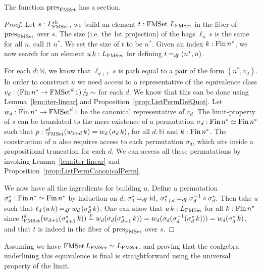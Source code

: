 \documentclass[a4paper,USenglish,cleveref]{lipics-v2021}
\begin{document}
\begin{theorem}\label{thm:PresSplitEpi}
 The function $\pres{\FMSet}$ has a section.
\end{theorem}
\begin{proof}
  Let $s : \LimSh{\FMSet}$, we build an element $t : \FMSet \,\Lim{\FMSet}$ in the fiber of $\pres{\FMSet}$ over $s$. The size (i.e. the 1st projection) of the bags $\ell_n\,s$ is the same for all $n$, call it $n^*$. We set the size of $t$ to be $n^*$. Given an index $k : \Fin n^*$, we now search for an element $u\,k : \Lim{\FMSet}$ for defining $t \DefEq (n^*,u)$.

  For each $d : ℕ$, we know that $\ell_{d + 1}\,s$ is path equal to a pair of the form $(n^*,v_d)$. In order to construct $u$ we need access to a representative of the equivalence class $v_d : \SetQuot[(\Fin n^* \to \FMSet^d 1)][\sim]$ for each $d$. We know that this can be done using Lemma~\ref{lem:iter-linear} and Proposition~\ref{prop:ListPermDefQuot}. Let $w_d : \Fin n^* \to \FMSet^d 1$ be the canonical representative of $v_d$.
  The limit-property of $s$ can be translated to the mere existence of a permutation $\sigma_d : \Fin n^* \simeq \Fin n^*$
  such that $p : \Bang_{\FMSet}^d(w_{1 + d}\, k) = w_d \,(\sigma_d\,k)$, for all $d: ℕ$ and $k : \Fin n^*$. The construction of $u$ also requires access to each permutation $\sigma_d$, which sits inside a propositional truncation for each $d$. We can access all these permutations by invoking Lemma~\ref{lem:iter-linear} and Proposition~\ref{prop:ListPermCanonicalPerm}.

  We now have all the ingredients for building $u$. Define a permutation $\sigma^*_d : \Fin n^* \simeq \Fin n^*$ by induction on $d$: $\sigma^*_0 \DefEq \Op{id}$, $\sigma^*_{1+d} \DefEq \sigma_d^{-1} \circ \sigma^*_d$. Then take $u$ such that $\ell_d \,(u\,k) \DefEq w_d\,(\sigma^*_d \,k)$. One can show that $u\,k : \Lim{\FMSet}$ for all $k : \Fin n^*$ since
  $\Bang_{\FMSet}^d (w_{d+1}(\sigma^*_{d+1}\, k)) \stackrel{p}{=} w_d (\sigma_d (\sigma^*_{d+1}\, k)) = w_d (\sigma_d (\sigma_d^{-1} (\sigma^*_d\, k))) = w_d (\sigma^*_d\, k)$,
  and that $t$ is indeed in the fiber of $\pres{\FMSet}$ over $s$.
\end{proof}

Assuming \LLPO{} we have $\FMSet \Lim{\FMSet} \simeq \Lim{\FMSet}$, and proving that the coalgebra underlining this equivalence is final is straightforward using the universal property of the limit.
\end{document}
